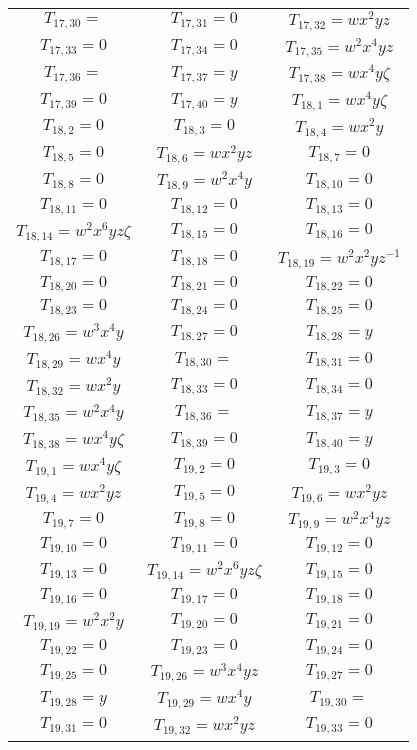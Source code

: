 \begin{longtable}{|c|c|c|}
$T_{17,30}= $&
$T_{17,31}= 0$&
$T_{17,32}= wx^2yz$\\
$T_{17,33}= 0$&
$T_{17,34}= 0$&
$T_{17,35}= w^2x^4yz$\\
$T_{17,36}= $&
$T_{17,37}= y$&
$T_{17,38}= wx^4y\zeta$\\
$T_{17,39}= 0$&
$T_{17,40}= y$&
$T_{18,1}= wx^4y\zeta$\\
$T_{18,2}= 0$&
$T_{18,3}= 0$&
$T_{18,4}= wx^2y$\\
$T_{18,5}= 0$&
$T_{18,6}= wx^2yz$&
$T_{18,7}= 0$\\
$T_{18,8}= 0$&
$T_{18,9}= w^2x^4y$&
$T_{18,10}= 0$\\
$T_{18,11}= 0$&
$T_{18,12}= 0$&
$T_{18,13}= 0$\\
$T_{18,14}= w^2x^6yz\zeta$&
$T_{18,15}= 0$&
$T_{18,16}= 0$\\
$T_{18,17}= 0$&
$T_{18,18}= 0$&
$T_{18,19}= w^2x^2yz^{-1}$\\
$T_{18,20}= 0$&
$T_{18,21}= 0$&
$T_{18,22}= 0$\\
$T_{18,23}= 0$&
$T_{18,24}= 0$&
$T_{18,25}= 0$\\
$T_{18,26}= w^3x^4y$&
$T_{18,27}= 0$&
$T_{18,28}= y$\\
$T_{18,29}= wx^4y$&
$T_{18,30}= $&
$T_{18,31}= 0$\\
$T_{18,32}= wx^2y$&
$T_{18,33}= 0$&
$T_{18,34}= 0$\\
$T_{18,35}= w^2x^4y$&
$T_{18,36}= $&
$T_{18,37}= y$\\
$T_{18,38}= wx^4y\zeta$&
$T_{18,39}= 0$&
$T_{18,40}= y$\\
$T_{19,1}= wx^4y\zeta$&
$T_{19,2}= 0$&
$T_{19,3}= 0$\\
$T_{19,4}= wx^2yz$&
$T_{19,5}= 0$&
$T_{19,6}= wx^2yz$\\
$T_{19,7}= 0$&
$T_{19,8}= 0$&
$T_{19,9}= w^2x^4yz$\\
$T_{19,10}= 0$&
$T_{19,11}= 0$&
$T_{19,12}= 0$\\
$T_{19,13}= 0$&
$T_{19,14}= w^2x^6yz\zeta$&
$T_{19,15}= 0$\\
$T_{19,16}= 0$&
$T_{19,17}= 0$&
$T_{19,18}= 0$\\
$T_{19,19}= w^2x^2y$&
$T_{19,20}= 0$&
$T_{19,21}= 0$\\
$T_{19,22}= 0$&
$T_{19,23}= 0$&
$T_{19,24}= 0$\\
$T_{19,25}= 0$&
$T_{19,26}= w^3x^4yz$&
$T_{19,27}= 0$\\
$T_{19,28}= y$&
$T_{19,29}= wx^4y$&
$T_{19,30}= $\\
$T_{19,31}= 0$&
$T_{19,32}= wx^2yz$&
$T_{19,33}= 0$\\

\end{longtable}
